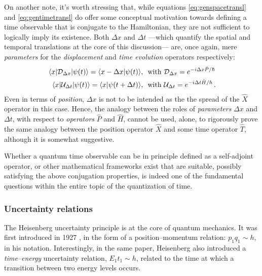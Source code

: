 On another note, it's worth stressing that,
while equations \eqref{eq:genspacetransl} and \eqref{eq:gentimetransl}
do offer some conceptual motivation towards defining a time observable that is conjugate to the Hamiltonian,
they are not sufficient to logically imply its existence.
Both $\Delta{x}$ and $\Delta{t}$ ---which quantify the spatial and temporal translations at the core of this discussion---
are, once again, mere \emph{parameters} for the \emph{displacement} and \emph{time evolution} operators respectively:
\begin{align}
  \mel{x}{\mathcal{D}_{\Delta{x}}}{\psi(t)}        = \braket{x-\Delta{x}}{\psi(t)}\!\text{, }
    &\text{ with } \mathcal{D}_{\Delta{x}}    = e^{-i \Delta x \hat{P} / \hbar} \\
  \mel{x}{\mathcal{U}_{\Delta{t}}}{\psi(t)}        = \braket{x}{\psi(t+\Delta{t})}\!\text{, }
    &\text{ with } \mathcal{U}_{\Delta{t}}    = e^{-i \Delta t \hat{H} / \hbar}
  \, \text{.}
\end{align}
Even in terms of \emph{position},
$\Delta x$ is not to be intended as the the spread of the $\hat{X}$ operator in this case.
Hence, the analogy between the roles of \emph{parameters} $\Delta x$ and $\Delta t$,
with respect to \emph{operators} $\hat{P}$ and $\hat{H}$,
cannot be used, alone, to rigorously prove the same analogy between the position operator $\hat{X}$
and some time operator $\hat{T}$, although it is somewhat suggestive.

Whether a quantum time observable can be in principle defined as a self-adjoint
operator, or other mathematical frameworks exist that are suitable,
possibly satisfying the above conjugation properties,
is indeed one of the fundamental questions within the entire topic
of the quantization of time.

\subsubsection{Uncertainty relations}

The Heisenberg uncertainty principle is at the core of quantum mechanics.
It was first introduced in 1927 \parencite{Heisenberg:Uncertainty},
in the form of a position--momentum relation: $p_{1}q_{1} \sim h$, in his notation.
Interestingly, in the same paper, Heisenberg also introduced
a \emph{time--energy} uncertainty relation, $E_{1}t_{1} \sim h$,
related to the time at which a transition between two energy levels occurs.

